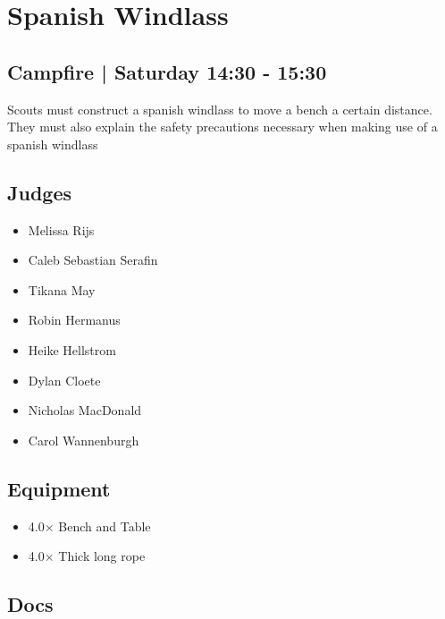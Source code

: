 \documentclass[10pt]{article}
\begin{document}
		\begin{minipage}{\linewidth}
		\setcounter{section}{7}
	\section{Spanish Windlass }
	\subsection*{Campfire | Saturday 14:30 - 15:30}

	Scouts must construct a spanish windlass to move a bench a certain distance. They must also explain the safety precautions necessary when making use of a spanish windlass

	\begin{multicols}{2}
	\subsection*{\faUsers \: Judges}
	\begin{itemize}
			\item Melissa Rijs
			\item Caleb Sebastian Serafin
			\item Tikana May
			\item Robin Hermanus
			\item Heike Hellstrom
			\item Dylan Cloete
			\item Nicholas MacDonald
			\item Carol Wannenburgh
		\end{itemize}
	\columnbreak
	\subsection*{\faWrench \: Equipment}
	
        \begin{itemize}
                    \item 4.0$\times$ \: Bench and Table
                    \item 4.0$\times$ \: Thick long rope
                \end{itemize}
                \vfill\null
        \subsection*{\faFile \: Docs}
     	\end{multicols}


	\vspace{1cm}
	\end{minipage}
\end{document}
